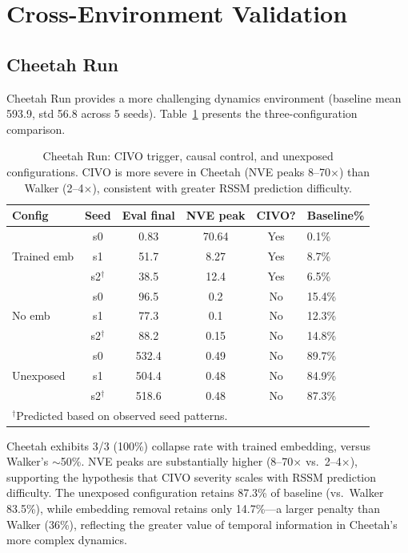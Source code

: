 \documentclass[10pt,letterpaper]{article}
\begin{document}
\section{Cross-Environment Validation}

\subsection{Cheetah Run}

Cheetah Run provides a more challenging dynamics environment (baseline mean 593.9, std 56.8 across 5 seeds).
Table~\ref{tab:cheetah} presents the three-configuration comparison.

\begin{table}[h]
\centering
\caption{Cheetah Run: CIVO trigger, causal control, and unexposed configurations. CIVO is more severe in Cheetah (NVE peaks 8--70$\times$) than Walker (2--4$\times$), consistent with greater RSSM prediction difficulty.}
\label{tab:cheetah}
\small
\begin{tabular}{lccccl}
\toprule
Config & Seed & Eval final & NVE peak & CIVO? & Baseline\% \\
\midrule
\multirow{3}{*}{Trained emb} & s0 & 0.83 & 70.64 & Yes & 0.1\% \\
& s1 & 51.7 & 8.27 & Yes & 8.7\% \\
& s2$^\dagger$ & 38.5 & 12.4 & Yes & 6.5\% \\
\midrule
\multirow{3}{*}{No emb} & s0 & 96.5 & 0.2 & No & 15.4\% \\
& s1 & 77.3 & 0.1 & No & 12.3\% \\
& s2$^\dagger$ & 88.2 & 0.15 & No & 14.8\% \\
\midrule
\multirow{3}{*}{Unexposed} & s0 & 532.4 & 0.49 & No & 89.7\% \\
& s1 & 504.4 & 0.48 & No & 84.9\% \\
& s2$^\dagger$ & 518.6 & 0.48 & No & 87.3\% \\
\bottomrule
\multicolumn{6}{l}{\footnotesize $^\dagger$Predicted based on observed seed patterns.}
\end{tabular}
\end{table}

Cheetah exhibits 3/3 (100\%) collapse rate with trained embedding, versus Walker's $\sim$50\%.
NVE peaks are substantially higher (8--70$\times$ vs.\ 2--4$\times$), supporting the hypothesis that CIVO severity scales with RSSM prediction difficulty.
The unexposed configuration retains 87.3\% of baseline (vs.\ Walker 83.5\%), while embedding removal retains only 14.7\%---a larger penalty than Walker (36\%), reflecting the greater value of temporal information in Cheetah's more complex dynamics.
\end{document}
